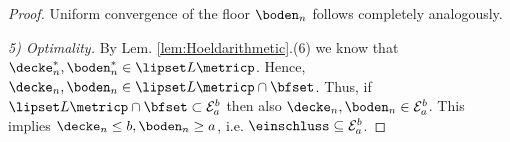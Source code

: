 \begin{thm}
\begin{proof}
Uniform convergence of the floor $\boden_n$ follows completely analogously.


\textit{5) Optimality.}  By Lem. \ref{lem:Hoeldarithmetic}.(6) we know that $\decke_n^*,\boden_n^* \in \lipset L \metricp$. Hence, $\decke_n , \boden_n \in \lipset L \metricp \cap \bfset$. 
Thus, if $\lipset L \metricp \cap \bfset \subset \mathcal E^b_a $ then also $\decke_n, \boden_n \in \mathcal E^b_a$. This implies $\decke_n \leq b, \boden_n \geq a$, i.e. $\einschluss \subseteq \mathcal E^b_a$.
\end{proof} 
\end{thm}


